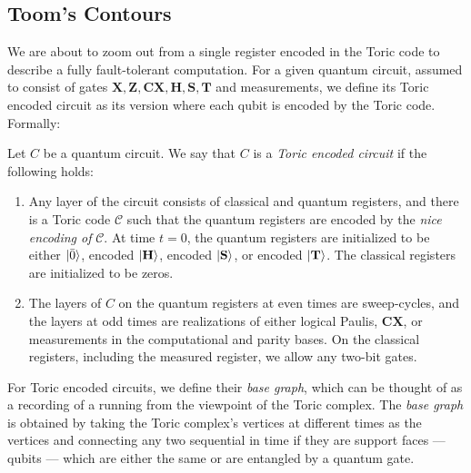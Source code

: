 




\subsection{Toom's Contours}
\label{subsection:toricencoded}
We are about to zoom out from a single register encoded in the Toric code to describe a fully fault-tolerant computation. For a given quantum circuit, assumed to consist of gates $\mathbf{X}, \mathbf{Z}, \mathbf{CX}, \mathbf{H}, \mathbf{S}, \mathbf{T}$ and measurements, we define its Toric encoded circuit as its version where each qubit is encoded by the Toric code. Formally:
    \begin{definition}
      Let $C$ be a quantum circuit. We say that $C$ is a \textit{Toric encoded circuit} if the following holds:
      \begin{enumerate}
        \item Any layer of the circuit consists of classical and quantum registers, and there is a Toric code $\mathcal{C}$ such that the quantum registers are encoded by the \textit{nice encoding of} $\mathcal{C}$. At time $t=0$, the quantum registers are initialized to be either $\ket{\bar{0}}$, encoded $\ket{\mathbf{H}}$, encoded $\ket{\mathbf{S}}$, or encoded $\ket{\mathbf{T}}$. The classical registers are initialized to be zeros.
        \item The layers of $C$ on the quantum registers at even times are sweep-cycles, and the layers at odd times are realizations of either logical Paulis, $\mathbf{CX}$, or measurements in the computational and parity bases. On the classical registers, including the measured register, we allow any two-bit gates.
        \end{enumerate} 
    \end{definition}

For Toric encoded circuits, we define their \textit{base graph}, which can be thought of as a recording of a running from the viewpoint of the Toric complex. The \textit{base graph} is obtained by taking the Toric complex's vertices at different times as the vertices and connecting any two sequential in time if they are support faces — qubits — which are either the same or are entangled by a quantum gate.


